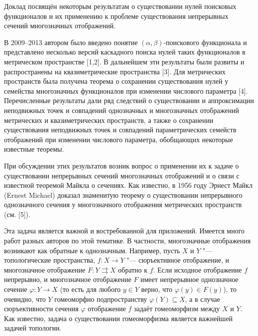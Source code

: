 
\vzmscaption

Доклад посвящён некоторым результатам о существовании нулей поисковых функционалов и их применению к проблеме существования непрерывных сечений многозначных отображений.

В 2009--2013 автором было введено понятие  $(\alpha,\beta)$-по\-ис\-ко\-во\-го функционала и представлено несколько версий каскадного поиска нулей таких функционалов в метрическом пространстве [1,2]. В дальнейшем эти результаты были развиты и распространены на квазиметрические пространства [3]. Для метрических пространств была получена теорема о сохранении существования нулей у семейства многозначных функционалов при изменении числового параметра [4]. Перечисленные результаты дали ряд следствий о существовании и аппроксимации неподвижных точек и совпадений однозначных и многозначных отображений метрических и квазиметрических пространств, а также о сохранении существования неподвижных точек и совпадений параметрических семейств  отображений при изменении числового параметра, обобщающих некоторые известные теоремы.

При обсуждении этих результатов возник вопрос о применении их к задаче о существовании непрерывных сечений многозначных отображений и о связи с известной теоремой Майкла о сечениях.
Как известно, в  1956 году Эрнест Майкл \foreignlanguage{english}{(Ernest Michael)}
доказал знаменитую теорему о существовании непрерывного однозначного сечения у многозначного отображения метрических пространств (см. [5]).

Эта задача  является важной и востребованной для приложений. Имеется много работ разных авторов по этой тематике. В частности, многозначные отображения возникают как обратные к однозначным. Например, пусть $X$ и $Y$ "--- топологические пространства, $f: X\to Y$ "--- сюръективное отображение, и многозначное отображение $F: Y\rightrightarrows X$  обратно к $f$. Если исходное отображение $f$ непрерывно, и многозначное отображение $F$ имеет непрерывное однозначное сечение $\varphi: Y\to X$ (то есть для любого $y\in Y$ верно, что $\varphi(y)\in F(y)$), то очевидно, что $Y$ гомеоморфно подпространству $\varphi(Y)\subseteq X$, а в случае сюръективности сечения $\varphi$ отображение $f$ задаёт гомеоморфизм между $X$ и $Y$. Как известно, задача о существовании гомеоморфизма является важнейшей задачей топологии.

